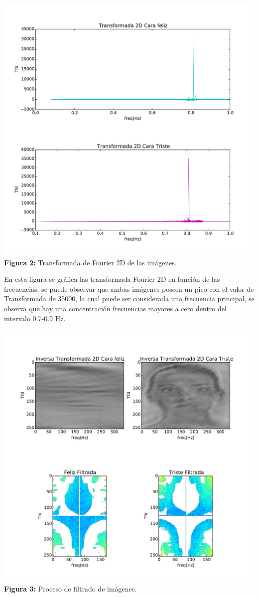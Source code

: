 \documentclass[11pt,letterpaper]{exam}
\begin{document}
\begin{center}
\includegraphics[width=16.cm]{FFt.pdf}
\textbf{Figura 2:}{ Transformada de Fourier 2D de las im\'agenes.}
\end{center}

{En esta figura se gr\'afica las transformada Fourier 2D en funci\'on de las frecuencias, se puede observar que ambas im\'agenes poseen un pico con el valor de Transformada de 35000, la cual puede ser considerada una frecuencia principal, se observa que hay una concentración frecuencias mayores a cero dentro del intervalo 0.7-0.9 Hz.	
}

\begin{center}
\includegraphics[width=16.cm]{ImProceso.pdf}
\textbf{Figura 3:}{ Proceso de filtrado de im\'agenes.}
\end{center}
\end{document}
